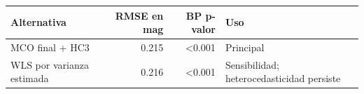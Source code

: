 \begin{tabular}{lrrl}
\toprule
Alternativa & RMSE en mag & BP p-valor & Uso \\
\midrule
MCO final + HC3 & 0.215 & <0.001 & Principal \\
WLS por varianza estimada & 0.216 & <0.001 & Sensibilidad; heterocedasticidad persiste \\
\bottomrule
\end{tabular}
